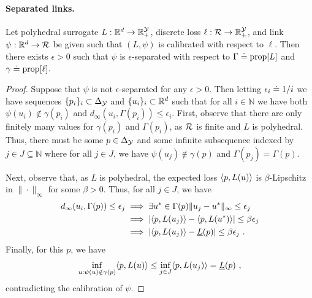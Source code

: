 \paragraph{Separated links.}

\begin{lemma*}
  Let polyhedral surrogate $L:\mathbb{R}^d \to \mathbb{R}^{\mathcal{Y}}_+$, discrete loss $\ell:\mathcal{R}\to\mathbb{R}^{\mathcal{Y}}_+$, and link $\psi:\mathbb{R}^d\to\mathcal{R}$ be given such that $(L,\psi)$ is calibrated with respect to $\ell$.
  Then there exists $\epsilon>0$ such that $\psi$ is $\epsilon$-separated with respect to   $\Gamma \doteq \mathrm{prop}[L]$ and $\gamma \doteq \mathrm{prop}[\ell]$.
\end{lemma*}
\begin{proof}
  Suppose that $\psi$ is not $\epsilon$-separated for any $\epsilon>0$.
  Then letting $\epsilon_i \doteq 1/i$ we have sequences $\{p_i\}_i \subset \Delta_{\mathcal{Y}}$ and  $\{u_i\}_i \subset \mathbb{R}^d$ such that for all $i\in\mathbb N$ we have both $\psi(u_i) \notin \gamma(p_i)$ and $d_\infty(u_i,\Gamma(p_i)) \leq \epsilon_i$.
  First, observe that there are only finitely many values for $\gamma(p_i)$ and $\Gamma(p_i)$, as $\mathcal{R}$ is finite and $L$ is polyhedral.
  Thus, there must be some $p\in\Delta_{\mathcal{Y}}$ and some infinite subsequence indexed by $j\in J \subseteq \mathbb N$ where
  for all $j\in J$, we have $\psi(u_j) \notin \gamma(p)$ and $\Gamma(p_j) = \Gamma(p)$.

  Next, observe that, as $L$ is polyhedral, the expected loss $\langle p, L(u) \rangle$ is $\beta$-Lipschitz in $\|\cdot\|_\infty$ for some $\beta>0$.
  Thus, for all $j\in J$, we have
  \begin{align*}
    d_\infty(u_i,\Gamma(p)) \leq \epsilon_j
    &\implies \exists u^*\in\Gamma(p) \|u_j-u^*\|_\infty \leq \epsilon_j
    \\
    &\implies \left| \langle p, L(u_j) \rangle - \langle p, L(u^*) \rangle \right| \leq \beta\epsilon_j
    \\
    &\implies \left| \langle p, L(u_j) \rangle - \underline{L}(p) \right| \leq \beta\epsilon_j~.
  \end{align*}
  Finally, for this $p$, we have
  \begin{align*}
    \inf_{u:\psi(u)\notin\gamma(p)} \langle p, L(u) \rangle
    \leq
    \inf_{j\in J} \langle p, L(u_j) \rangle
    =
    \underline{L}(p)~,
  \end{align*}
  contradicting the calibration of $\psi$.
\end{proof}

